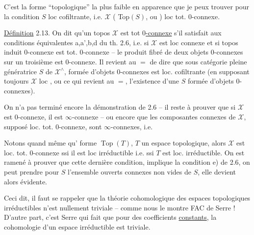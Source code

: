C'est la forme ``topologique'' la plus faible en apparence que je peux trouver pour la condition $S$ loc cofiltrante, i.e. $\mathscr X$ (  Top$(S)$, ou )  loc tot.  $0$-connexe.

\uline{Définition} 2.13. On dit qu'un topos $\mathscr X$ est \uline{} tot \uline{$0$-connexe} s'il satisfait aux conditions équivalentes a,a',b,d du th. 2.6, i.e. si $\mathscr X$ est loc connexe et si   topos induit $0$-connexe est tot. $0$-connexe --   le produit fibré de deux objets $0$-connexes sur un troisième est $0$-connexe. Il revient au $=$ de dire que   sous catégorie pleine génératrice $S$ de $\mathscr X^\wedge$, formée d'objets $0$-connexes est loc. cofiltrante (en supposant toujours $\mathscr X$ loc , ou ce qui revient au $=$, l'existence d'une $S$ formée d'objets $0$-connexes).

\reversemarginpar{}\normalmarginpar

 On n'a pas terminé encore la démonstration de 2.6 -- il reste à prouver  que si $\mathscr X$ est $0$-connexe, il est $\infty$-connexe -- ou encore que les composantes connexes de $\mathscr X$, supposé loc. tot. $0$-connexe, sont $\infty$-connexes, i.e. 


 Notons quand même qu'  forme $\operatorname{Top}(T)$, $T$ un espace topologique, alors $\mathscr X$ est loc. tot. $0$-connexe ssi il est loc irréductible i.e. ssi $T$ est loc. irréductible. On est ramené à prouver que cette dernière condition, implique  la condition e) de 2.6,  on peut prendre pour $S$ l'ensemble  ouverts connexes non vides de $S$, elle devient alors évidente.

Ceci dit, il faut se rappeler que la théorie cohomologique des espaces topologiques irréductibles n'est nullement triviale -- comme nous le montre FAC de Serre ! D'autre part, c'est Serre qui  fait  que pour des coefficients \uline{constants}, la cohomologie d'un espace irréductible est triviale.

